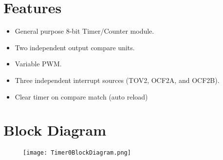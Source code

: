 


% 

\section{Features}
\begin{itemize}
    \item General purpose 8-bit Timer/Counter module.
    \item Two independent output compare units.
    \item Variable PWM.
    \item Three independent interrupt sources (TOV2, OCF2A, and OCF2B).
    \item Clear timer on compare match (auto reload)
\end{itemize}

\section{Block Diagram}
\begin{figure}[H]
    \begin{center}
        \texttt{[image: Timer0BlockDiagram.png]}
    \end{center}
\end{figure}

